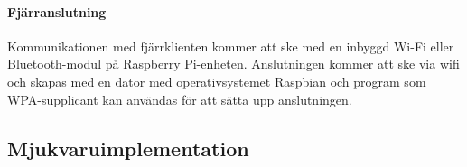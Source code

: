 \documentclass[designspec/spec.tex]{subfiles}
\begin{document}
\paragraph{Fjärranslutning}
Kommunikationen med fjärrklienten kommer att ske med en inbyggd Wi-Fi eller
Bluetooth-modul på Raspberry Pi-enheten. Anslutningen kommer att ske via wifi
och skapas med en dator med operativsystemet Raspbian och program som
WPA-supplicant kan användas för att sätta upp anslutningen.

\subsection{Mjukvaruimplementation}
\end{document}
